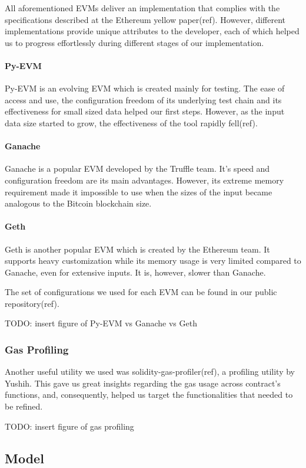 All aforementioned EVMs deliver an implementation that complies with
the specifications described at the Ethereum yellow paper(ref).
However, different implementations provide unique attributes to the
developer, each of which helped us to progress effortlessly during
different stages of our implementation. \paragraph {Py-EVM} Py-EVM is
an evolving EVM which is created mainly for testing. The ease of
access and use, the configuration freedom of its underlying test chain
and its effectiveness for small sized data helped our first steps.
However, as the input data size started to grow, the effectiveness of
the tool rapidly fell(ref). \paragraph {Ganache} Ganache is a popular
EVM developed by the Truffle team. It’s speed and configuration
freedom are its main advantages. However, its extreme memory
requirement made it impossible to use when the sizes of the input
became analogous to the Bitcoin blockchain size. \paragraph {Geth}
Geth is another popular EVM which is created by the Ethereum team. It
supports heavy customization while its memory usage is very limited
compared to Ganache, even for extensive inputs. It is, however, slower
than Ganache.

The set of configurations we used for each EVM can be found in our
public repository(ref).

TODO: insert figure of Py-EVM vs Ganache vs Geth

\subsubsection{Gas Profiling}

Another useful utility we used was solidity-gas-profiler(ref), a
profiling utility by Yushih. This gave us great insights regarding the
gas usage across contract’s functions, and, consequently, helped us
target the functionalities that needed to be refined.

TODO: insert figure of gas profiling

\subsection{Model}

